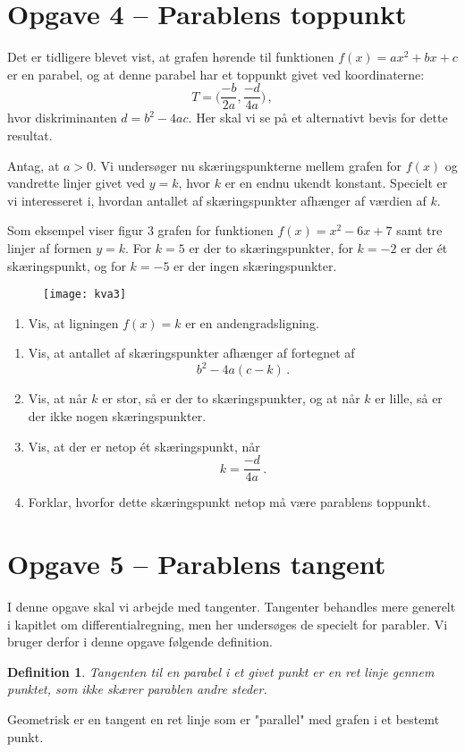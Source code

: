 \documentclass[12pt,oneside,a4paper]{article}
\theoremstyle{plain}
\newtheorem*{mydef}{Definition}
\begin{document}
\section*{Opgave 4 -- Parablens toppunkt}
Det er tidligere blevet vist, at grafen hørende til funktionen $f(x) = ax^2 + bx + c$
er en parabel, og at denne parabel har et toppunkt givet ved koordinaterne:
\[
    T = \Big(\frac{-b}{2a}, \frac{-d}{4a}\Big) \,,
\]
hvor diskriminanten $d=b^2-4ac$. Her skal vi se på et alternativt bevis for dette
resultat.

Antag, at $a>0$. Vi undersøger nu skæringspunkterne mellem grafen for $f(x)$ og
vandrette linjer givet ved $y=k$, hvor $k$ er en endnu ukendt konstant.
Specielt er vi interesseret i, hvordan antallet af skæringspunkter afhænger af
værdien af $k$.

Som eksempel viser figur 3 grafen for funktionen $f(x) = x^2-6x+7$ samt tre linjer 
af formen $y=k$. For $k=5$ er der to skæringspunkter, for $k=-2$ er der ét skæringspunkt,
og for $k=-5$ er der ingen skæringspunkter.

\begin{figure}[ht]
    \centering
    \texttt{[image: kva3]}
    \caption{}
    \label{fig3}
\end{figure}

\begin{enumerate}[label=(\alph*)]
    \item Vis, at ligningen $f(x) = k$ er en andengradsligning.
\end{enumerate}

\begin{enumerate}[label=(\alph*), resume]
    \item Vis, at antallet af skæringspunkter afhænger af fortegnet af 
        \[
            b^2-4a(c-k) \,.
        \]
    \item Vis, at når $k$ er stor, så er der to skæringspunkter, og at
        når $k$ er lille, så er der ikke nogen skæringspunkter.
    \item Vis, at der er netop ét skæringspunkt, når
        \[
            k = \frac{-d}{4a} \,.
        \]
    \item Forklar, hvorfor dette skæringspunkt netop må være parablens toppunkt.
\end{enumerate}

\section*{Opgave 5 -- Parablens tangent}
I denne opgave skal vi arbejde med tangenter. Tangenter behandles mere generelt
i kapitlet om differentialregning, men her undersøges de specielt for parabler.
Vi bruger derfor i denne opgave følgende definition.
\begin{mydef}
    Tangenten til en parabel i et givet punkt er en ret linje gennem punktet, som
    ikke skærer parablen andre steder.
\end{mydef}
Geometrisk er en tangent en ret linje som er "parallel" med grafen i et bestemt punkt.
\end{document}
